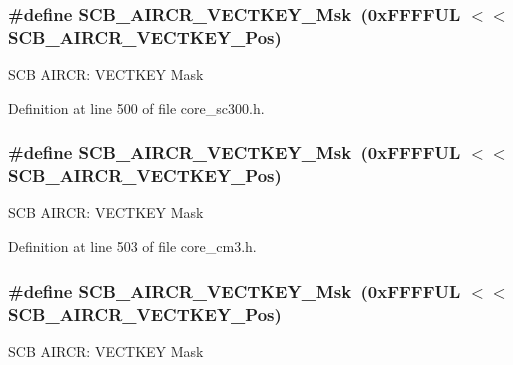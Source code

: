 \subsubsection[{\texorpdfstring{S\+C\+B\+\_\+\+A\+I\+R\+C\+R\+\_\+\+V\+E\+C\+T\+K\+E\+Y\+\_\+\+Msk}{SCB_AIRCR_VECTKEY_Msk}}]{\setlength{\rightskip}{0pt plus 5cm}\#define S\+C\+B\+\_\+\+A\+I\+R\+C\+R\+\_\+\+V\+E\+C\+T\+K\+E\+Y\+\_\+\+Msk~(0x\+F\+F\+F\+F\+U\+L $<$$<$ S\+C\+B\+\_\+\+A\+I\+R\+C\+R\+\_\+\+V\+E\+C\+T\+K\+E\+Y\+\_\+\+Pos)}\hypertarget{group___c_m_s_i_s___s_c_b_ga90c7cf0c490e7ae55f9503a7fda1dd22}{}\label{group___c_m_s_i_s___s_c_b_ga90c7cf0c490e7ae55f9503a7fda1dd22}
S\+CB A\+I\+R\+CR\+: V\+E\+C\+T\+K\+EY Mask 

Definition at line 500 of file core\+\_\+sc300.\+h.

\subsubsection[{\texorpdfstring{S\+C\+B\+\_\+\+A\+I\+R\+C\+R\+\_\+\+V\+E\+C\+T\+K\+E\+Y\+\_\+\+Msk}{SCB_AIRCR_VECTKEY_Msk}}]{\setlength{\rightskip}{0pt plus 5cm}\#define S\+C\+B\+\_\+\+A\+I\+R\+C\+R\+\_\+\+V\+E\+C\+T\+K\+E\+Y\+\_\+\+Msk~(0x\+F\+F\+F\+F\+U\+L $<$$<$ S\+C\+B\+\_\+\+A\+I\+R\+C\+R\+\_\+\+V\+E\+C\+T\+K\+E\+Y\+\_\+\+Pos)}\hypertarget{group___c_m_s_i_s___s_c_b_ga90c7cf0c490e7ae55f9503a7fda1dd22}{}\label{group___c_m_s_i_s___s_c_b_ga90c7cf0c490e7ae55f9503a7fda1dd22}
S\+CB A\+I\+R\+CR\+: V\+E\+C\+T\+K\+EY Mask 

Definition at line 503 of file core\+\_\+cm3.\+h.

\subsubsection[{\texorpdfstring{S\+C\+B\+\_\+\+A\+I\+R\+C\+R\+\_\+\+V\+E\+C\+T\+K\+E\+Y\+\_\+\+Msk}{SCB_AIRCR_VECTKEY_Msk}}]{\setlength{\rightskip}{0pt plus 5cm}\#define S\+C\+B\+\_\+\+A\+I\+R\+C\+R\+\_\+\+V\+E\+C\+T\+K\+E\+Y\+\_\+\+Msk~(0x\+F\+F\+F\+F\+U\+L $<$$<$ S\+C\+B\+\_\+\+A\+I\+R\+C\+R\+\_\+\+V\+E\+C\+T\+K\+E\+Y\+\_\+\+Pos)}\hypertarget{group___c_m_s_i_s___s_c_b_ga90c7cf0c490e7ae55f9503a7fda1dd22}{}\label{group___c_m_s_i_s___s_c_b_ga90c7cf0c490e7ae55f9503a7fda1dd22}
S\+CB A\+I\+R\+CR\+: V\+E\+C\+T\+K\+EY Mask 

